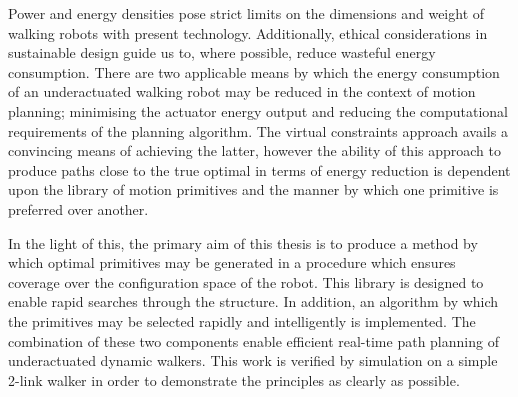 Power and energy densities pose strict limits on the dimensions and weight of walking robots with present technology. Additionally, ethical considerations in sustainable design guide us to, where possible, reduce wasteful energy consumption. There are two applicable means by which the energy consumption of an underactuated walking robot may be reduced in the context of motion planning; minimising the actuator energy output and reducing the computational requirements of the planning algorithm. The virtual constraints approach avails a convincing means of achieving the latter, however the ability of this approach to produce paths close to the true optimal in terms of energy reduction is dependent upon the library of motion primitives and the manner by which one primitive is preferred over another.

In the light of this, the primary aim of this thesis is to produce a method by which optimal primitives may be generated in a procedure which ensures coverage over the configuration space of the robot. This library is designed to enable rapid searches through the structure. In addition, an algorithm by which the primitives may be selected rapidly and intelligently is implemented. The combination of these two components enable efficient real-time path planning of underactuated dynamic walkers. This work is verified by simulation on a simple 2-link walker in order to demonstrate the principles as clearly as possible.